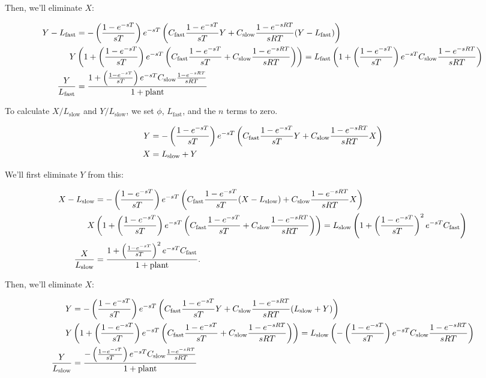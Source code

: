 \documentclass{article}
\begin{document}
    Then, we'll eliminate $X$:

    \begin{align*}
        Y - L_{\text{fast}} &= -\left(\frac{1 - e^{-sT}}{sT}\right) e^{-sT} \left(C_{\text{fast}} \frac{1 - e^{-sT}}{sT} Y + C_{\text{slow}} \frac{1 - e^{-sRT}}{sRT} (Y - L_{\text{fast}})\right) \\
        Y &\left(1 + \left(\frac{1 - e^{-sT}}{sT}\right) e^{-sT} \left(C_{\text{fast}} \frac{1 - e^{-sT}}{sT} + C_{\text{slow}} \frac{1 - e^{-sRT}}{sRT}\right)\right) = L_{\text{fast}} \left(1 + \left(\frac{1 - e^{-sT}}{sT}\right) e^{-sT} C_{\text{slow}} \frac{1 - e^{-sRT}}{sRT}\right)\\
        \frac{Y}{L_{\text{fast}}} &= \frac{1 + \left(\frac{1 - e^{-sT}}{sT}\right) e^{-sT} C_{\text{slow}} \frac{1 - e^{-sRT}}{sRT}}{1 + \text{plant}}
    \end{align*}

    To calculate $X/L_{\text{slow}}$ and $Y/L_{\text{slow}}$, we set $\phi$, $L_{\text{fast}}$, and the $n$ terms to zero.

    \begin{align*}
        Y &= -\left(\frac{1 - e^{-sT}}{sT}\right) e^{-sT} \left(C_{\text{fast}} \frac{1 - e^{-sT}}{sT} Y + C_{\text{slow}} \frac{1 - e^{-sRT}}{sRT} X\right) \\
        X &= L_{\text{slow}} + Y \\
    \end{align*}

    We'll first eliminate $Y$ from this:

    \begin{align*}
        X - L_{\text{slow}} &= -\left(\frac{1 - e^{-sT}}{sT}\right) e^{-sT} \left(C_{\text{fast}} \frac{1 - e^{-sT}}{sT} (X - L_{\text{slow}}) + C_{\text{slow}} \frac{1 - e^{-sRT}}{sRT} X\right) \\
        X &\left(1 + \left(\frac{1 - e^{-sT}}{sT}\right) e^{-sT} \left(C_{\text{fast}} \frac{1 - e^{-sT}}{sT} + C_{\text{slow}} \frac{1 - e^{-sRT}}{sRT}\right)\right) = L_{\text{slow}} \left(1 + \left(\frac{1 - e^{-sT}}{sT}\right)^2 e^{-sT} C_{\text{fast}}\right)\\
        \frac{X}{L_{\text{slow}}} &= \frac{1 + \left(\frac{1 - e^{-sT}}{sT}\right)^2 e^{-sT} C_{\text{fast}}}{1 + \text{plant}}.
    \end{align*}

    Then, we'll eliminate $X$:

    \begin{align*}
        Y &= -\left(\frac{1 - e^{-sT}}{sT}\right) e^{-sT} \left(C_{\text{fast}} \frac{1 - e^{-sT}}{sT} Y + C_{\text{slow}} \frac{1 - e^{-sRT}}{sRT} (L_{\text{slow}} + Y)\right) \\
        Y &\left(1 + \left(\frac{1 - e^{-sT}}{sT}\right) e^{-sT} \left(C_{\text{fast}} \frac{1 - e^{-sT}}{sT} + C_{\text{slow}} \frac{1 - e^{-sRT}}{sRT}\right)\right) = L_{\text{slow}} \left(-\left(\frac{1 - e^{-sT}}{sT}\right) e^{-sT} C_{\text{slow}} \frac{1 - e^{-sRT}}{sRT}\right)\\
        \frac{Y}{L_{\text{slow}}} &= \frac{-\left(\frac{1 - e^{-sT}}{sT}\right) e^{-sT} C_{\text{slow}} \frac{1 - e^{-sRT}}{sRT}}{1 + \text{plant}}
    \end{align*}
\end{document}
